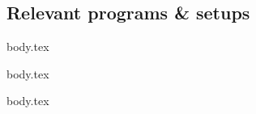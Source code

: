 \subsection{Relevant programs \& setups}

\ifdefined\wslRelevantWindowsTerminal
{body.tex}
\fi

\ifdefined\wslRelevantVscode
{body.tex}
\fi

\ifdefined\wslRelevantDocker
{body.tex}
\fi